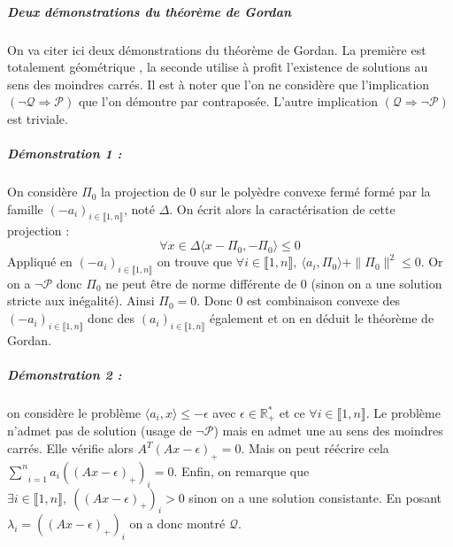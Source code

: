 \documentclass[10pt,a4paper]{article}
\begin{document}
\subparagraph{Deux démonstrations du théorème de Gordan}
On va citer ici deux démonstrations du théorème de Gordan.
La première est totalement géométrique \cite{dantzig1998linear}, la seconde utilise à profit l'existence de solutions au sens des moindres carrés.
Il est à noter que l'on ne considère que l'implication $(\neg \mathcal{Q} \Rightarrow \mathcal{P})$ que l'on démontre par contraposée.
L'autre implication $(\mathcal{Q} \Rightarrow \neg \mathcal{P})$ est triviale.
\subparagraph{Démonstration 1 :} On considère $\Pi_0$ la projection de $0$ sur le polyèdre convexe fermé formé par la famille $(-a_i)_{i \in \llbracket 1,n \rrbracket}$, noté $\Delta$.
On écrit alors la caractérisation de cette projection :
\begin{equation}
\forall x \in \Delta \langle x- \Pi_0,-\Pi_0 \rangle \le 0
\end{equation}
Appliqué en $(-a_i)_{i \in \llbracket 1,n \rrbracket}$ on trouve que $\forall i \in \llbracket 1,n \rrbracket, \ \langle a_i, \Pi_0 \rangle + \| \Pi_0 \|^2 \le 0$.
Or on a $\neg \mathcal{P}$ donc $\Pi_0$ ne peut être de norme différente de $0$ (sinon on a une solution stricte aux inégalité).
Ainsi $\Pi_0=0$.
Donc $0$ est combinaison convexe des $(-a_i)_{i \in \llbracket 1,n \rrbracket}$ donc des $(a_i)_{i \in \llbracket 1,n \rrbracket}$ également et on en déduit le théorème de Gordan.
\subparagraph{Démonstration 2 :} on considère le problème $\langle a_i, x \rangle \le -\epsilon$ avec $\epsilon \in \mathbb{R}_+^*$ et ce $\forall i \in \llbracket 1,n \rrbracket$.
Le problème n'admet pas de solution (usage de $\neg \mathcal{P}$) mais en admet une au sens des moindres carrés.
Elle vérifie alors $A^T(Ax-\epsilon)_+=0$.
Mais on peut réécrire cela $\underset{i=1}{\overset{n}{\sum}}a_i ((Ax-\epsilon)_+)_i=0$.
Enfin, on remarque que $\exists i \in \llbracket 1,n \rrbracket, \ ((Ax-\epsilon)_+)_i>0$ sinon on a une solution consistante.
En posant $\lambda_i=((Ax-\epsilon)_+)_i$ on a donc montré $\mathcal{Q}$.
\end{document}
